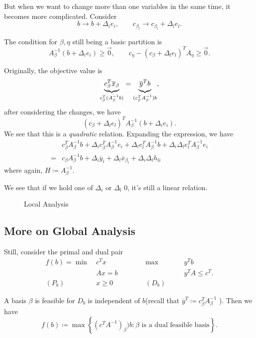But when we want to change more than one variables in the same time, it becomes more complicated. Consider
\[
	b\to b+\Delta_{i}e_{i}, \qquad c_{\beta_l}\to c_{\beta_l} + \Delta_l e_l.
\]

The condition for \(\beta, \eta\) still being a basic partition is
\[
	A_{\beta}^{-1}(b+\Delta_{i}e_{i})\geq \vec{0}, \qquad c_{\eta} - (c_{\beta}+\Delta_l e_l)^{T}A_{\eta}\geq \vec{0}.
\]

Originally, the objective value is
\[
	\underbrace{c_{\beta}^{T} \overline{x}_{\beta}}_{c_{\beta}^{T}(A^{-1}_{\beta}b)} = \underbrace{\vphantom{c_{\beta}^{T}}\overline{y}^{T}b}_{(c_{\beta}^{T}A^{-1}_{\beta})b},
\]
after considering the changes, we have
\[
	(c_{\beta}+\Delta_l e_l)^{T}A^{-1}_{\beta}(b+\Delta_{i}e_{i}).
\]
We see that this is a \emph{quadratic} relation. Expanding the expression, we have
\[
	\begin{split}
		&c_{\beta}^{T}A^{-1}_{\beta}b + \Delta_{i}c_{\beta}^{T}A^{-1}_{\beta}e_{i}+\Delta_{l}e_{l}^{T}A^{-1}_{\beta}b+\Delta_i \Delta_l e_{l}^{T}A^{-1}_{\beta}e_{i}\\
		=& c_{\beta}A^{-1}_{\beta}b+\Delta_{i}\overline{y}_{i}+\Delta_l \overline{x}_{\beta_l}+\Delta_{i}\Delta_l h_{li}
	\end{split}
\]
where again, \(H\coloneqq A^{-1}_{\beta}\).
\begin{remark}
	We see that if we hold one of \(\Delta_i\) or \(\Delta_l\) \(0\), it's still a linear relation.
\end{remark}

\begin{figure}[H]
	\centering
	\caption{Local Analysis}
	\label{fig:local-analysis}
\end{figure}

\subsection{More on Global Analysis}
Still, consider the primal and dual pair
\[
	\begin{alignedat}{5}
		f(b) = \min~&c^{T}x\qquad\qquad&&\max ~&&y^{T}b\\
		&Ax = b 				&&		&&y^{T}A\leq c^{T}.\\
		(P_b)\quad	&x\geq  0 	&&(D_b)\quad&&
	\end{alignedat}
\]

A basis \(\beta\) is feasible for \(D_b\) is independent of \(b\)(recall that \(\overline{y}^{T}\coloneqq c_{\beta}^{T}A^{-1}_{\beta}\) ). Then we have
\[
	f(b)\coloneqq \max\left\{ (c^{T}A^{-1})_{\beta})b \colon \beta \text{ is a dual feasible basis} \right\} .
\]

